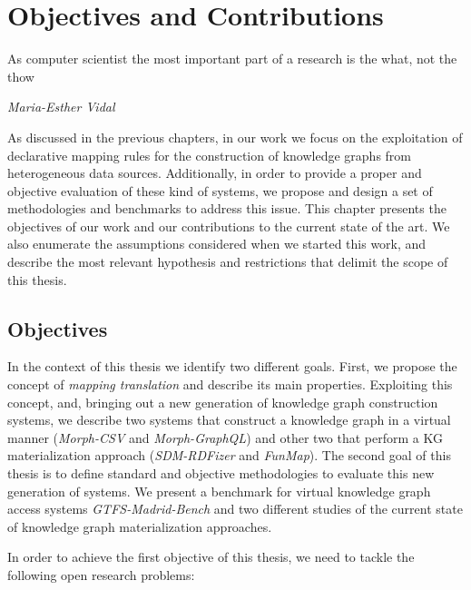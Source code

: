 \chapter{Objectives and Contributions}

\epigraph{As computer scientist the most important part of a research is the what, not the  thow}{\textit{Maria-Esther Vidal}}

\label{chap:objectives}
As discussed in the previous chapters, in our work we focus on the exploitation of declarative mapping rules for the construction of knowledge graphs from heterogeneous data sources. Additionally, in order to provide a proper and objective evaluation of these kind of systems, we propose and design a set of methodologies and benchmarks to address this issue. This chapter presents the objectives of our work and our contributions to the current state of the art. We also enumerate the assumptions considered when we started this work, and describe the most relevant hypothesis and restrictions that delimit the scope of this thesis.

\section{Objectives}
In the context of this thesis we identify two different goals. First, we propose the concept of \textit{mapping translation} and describe its main properties. Exploiting this concept, and, bringing out a new generation of knowledge graph construction systems, we describe two systems that construct a knowledge graph in a virtual manner (\textit{Morph-CSV} and \textit{Morph-GraphQL}) and other two that perform a KG materialization approach (\textit{SDM-RDFizer} and \textit{FunMap}). The second goal of this thesis is to define standard and objective methodologies to evaluate this new generation of systems. We present a benchmark for virtual knowledge graph access systems \textit{GTFS-Madrid-Bench} and two different studies of the current state of knowledge graph materialization approaches.

In order to achieve the first objective of this thesis, we need to tackle the following open research problems:

